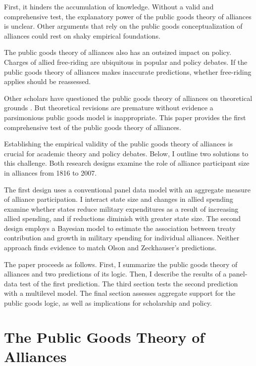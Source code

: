 \documentclass[12pt]{article}
\begin{document}
 
First, it hinders the accumulation of knowledge. 
Without a valid and comprehensive test, the explanatory power of the public goods theory of alliances is unclear. 
Other arguments that rely on the public goods conceptualization of alliances could rest on shaky empirical foundations. 


The public goods theory of alliances also has an outsized impact on policy. 
Charges of allied free-riding are ubiquitous in popular and policy debates. 
If the public goods theory of alliances makes inaccurate predictions, whether free-riding applies should be reassessed.


Other scholars have questioned the public goods theory of alliances on theoretical grounds \citep{Palmer1990, SandlerHartley2001}.  
But theoretical revisions are premature without evidence a parsimonious public goods model is inappropriate. 
This paper provides the first comprehensive test of the public goods theory of alliances.  


Establishing the empirical validity of the public goods theory of alliances is crucial for academic theory and policy debates. 
Below, I outline two solutions to this challenge. 
Both research designs examine the role of alliance participant size in alliances from 1816 to 2007. 


The first design uses a conventional panel data model with an aggregate measure of alliance participation. 
I interact state size and changes in allied spending examine whether states reduce military expenditures as a result of increasing allied spending, and if reductions diminish with greater state size. 
The second design employs a Bayesian model to estimate the association between treaty contribution and growth in military spending for individual alliances. 
Neither approach finds evidence to match Olson and Zeckhauser's predictions. 


The paper proceeds as follows.
First, I summarize the public goods theory of alliances and two predictions of its logic.
Then, I describe the results of a panel-data test of the first prediction.
The third section tests the second prediction with a multilevel model. 
The final section assesses aggregate support for the public goods logic, as well as implications for scholarship and policy. 


\section{The Public Goods Theory of Alliances}
\end{document}
